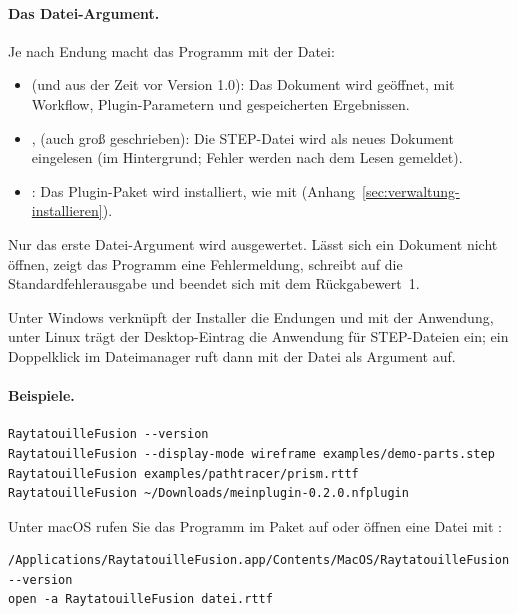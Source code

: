 \paragraph{Das Datei-Argument.} Je nach Endung macht das Programm mit der Datei:

\begin{itemize}
  \item {} (und  aus der Zeit vor Version 1.0): Das Dokument wird
        geöffnet, mit Workflow, Plugin-Parametern und gespeicherten Ergebnissen.
  \item {},  (auch groß geschrieben): Die STEP-Datei wird als neues
        Dokument eingelesen (im Hintergrund; Fehler werden nach dem Lesen gemeldet).
  \item {}: Das Plugin-Paket wird installiert, wie mit
         (Anhang~\ref{sec:verwaltung-installieren}).
\end{itemize}

Nur das erste Datei-Argument wird ausgewertet. Lässt sich ein Dokument nicht öffnen, zeigt das
Programm eine Fehlermeldung, schreibt  auf die Standardfehlerausgabe und
beendet sich mit dem Rückgabewert~1.

Unter Windows verknüpft der Installer die Endungen  und  mit der
Anwendung, unter Linux trägt der Desktop-Eintrag die Anwendung für STEP-Dateien ein; ein
Doppelklick im Dateimanager ruft dann  mit der Datei als Argument auf.

\paragraph{Beispiele.}

\begin{lstlisting}
RaytatouilleFusion --version
RaytatouilleFusion --display-mode wireframe examples/demo-parts.step
RaytatouilleFusion examples/pathtracer/prism.rttf
RaytatouilleFusion ~/Downloads/meinplugin-0.2.0.nfplugin
\end{lstlisting}

Unter macOS rufen Sie das Programm im Paket auf oder öffnen eine Datei mit :

\begin{lstlisting}
/Applications/RaytatouilleFusion.app/Contents/MacOS/RaytatouilleFusion --version
open -a RaytatouilleFusion datei.rttf
\end{lstlisting}

